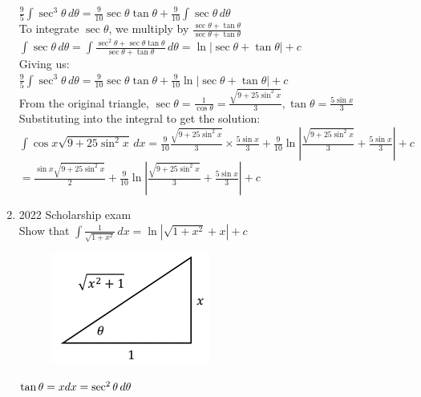 \documentclass[../main.tex]{subfiles}
\begin{document}
\begin{enumerate}
    \(\frac{9}{5}\int \sec^3{\theta}\,d\theta=\frac{9}{10}\sec{\theta}\tan{\theta} +\frac{9}{10}\int \sec{\theta}\,d\theta\)\\

    To integrate \(\sec{\theta}\), we multiply by \(\frac{\sec{\theta}+\tan{\theta}}{\sec{\theta}+\tan{\theta}}\)\\

    \(\int \sec{\theta}\,d\theta=\int \frac{\sec^2{\theta}+\sec{\theta}\tan{\theta}}{\sec{\theta}+\tan{\theta}}\,d\theta=\ln{|\sec{\theta}+\tan{\theta}|}+c\)\\

    Giving us:\\
    \(\frac{9}{5}\int \sec^3{\theta}\,d\theta=\frac{9}{10}\sec{\theta}\tan{\theta}+\frac{9}{10}\ln{|\sec{\theta}+\tan{\theta}|}+c\)\\

    From the original triangle, \(\sec{\theta}=\frac{1}{\cos{\theta}}=\frac{\sqrt{9+25\sin^2{x}}}{3}, \tan{\theta}=\frac{5\sin{x}}{3}\)\\

    Substituting into the integral to get the solution:\\
    \(\int \cos{x}\sqrt{9+25\sin^2{x}}\,dx=\frac{9}{10}\frac{\sqrt{9+25\sin^2{x}}}{3}\times \frac{5\sin{x}}{3}+\frac{9}{10}\ln{|\frac{\sqrt{9+25\sin^2{x}}}{3}+\frac{5\sin{x}}{3}|+c}\)\\

    \(=\frac{\sin{x}\sqrt{9+25\sin^2{x}}}{2}+\frac{9}{10}\ln{|\frac{\sqrt{9+25\sin^2{x}}}{3}+\frac{5\sin{x}}{3}|+c}\)\\
    \pagebreak
    \item 2022 Scholarship exam\\
    Show that \(\int \frac{1}{\sqrt{1+x^2}}\,dx=\ln{|\sqrt{1+x^2}+x|}+c\)
    \begin{figure}[h]
        \includegraphics{images/trigsuba12.png}
    \end{figure}

    \(\tan{\theta}=x\\
    dx=\sec^2{\theta}\,d\theta\)\\


\end{enumerate}
\end{document}
